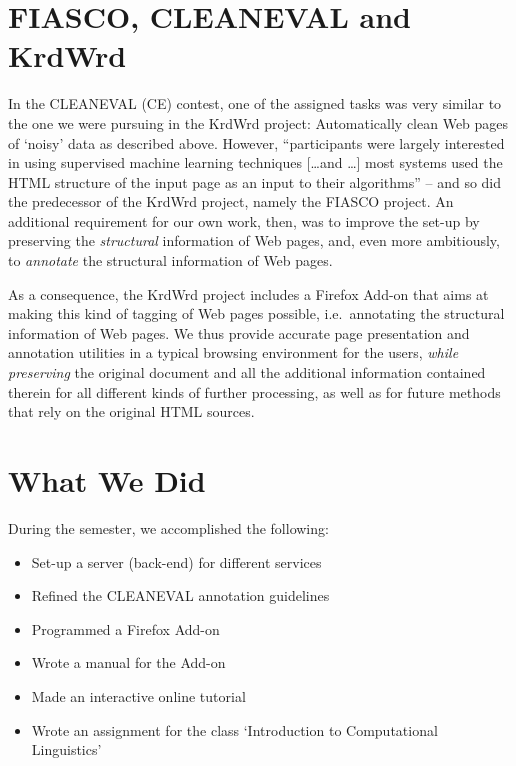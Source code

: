 \documentclass[12pt]{article}
\begin{document}
\section{FIASCO, CLEANEVAL and KrdWrd}

In the CLEANEVAL (CE) contest, one of the assigned tasks was very similar to the one we were pursuing in the KrdWrd project: 
Automatically clean Web pages of `noisy' data as described above. However, ``participants were largely interested in using supervised machine learning techniques [\ldots and \ldots] most systems used the HTML structure of the input page as an input to their algorithms'' \cite{BaroniChantreeKilgarriffSharoff2008} -- and so did the predecessor of the KrdWrd project, namely the FIASCO project\cite{FIASCO2007}. 
An additional requirement for our own work, then, was to improve the set-up by preserving the \textit{structural} information of Web pages, and, even more ambitiously, to \textit{annotate} the structural information of Web pages.

As a consequence, the KrdWrd project includes a Firefox Add-on that aims at making this kind of tagging of Web pages possible, i.e.~annotating the structural information of Web pages. 
We thus provide accurate page presentation and annotation utilities in a typical browsing environment for the users, \textit{while preserving} the original document and all the additional information contained therein for all different kinds of further processing, as well as for future methods that rely on the original HTML sources.


\section{What We Did}

During the semester, we accomplished the following:

\begin{itemize}
	\item Set-up a server (back-end) for different services
	\item Refined the CLEANEVAL annotation guidelines
	\item Programmed a Firefox Add-on
	\item Wrote a manual for the Add-on
	\item Made an interactive online tutorial
	\item Wrote an assignment for the class `Introduction to Computational Linguistics'
\end{itemize}
\end{document}
